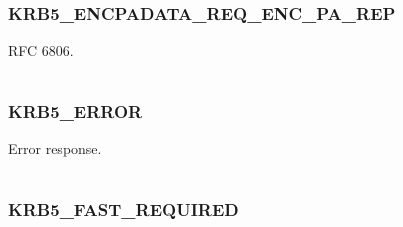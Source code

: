 \documentclass[letterpaper,10pt,english]{sphinxmanual}
\begin{document}
\subsubsection{KRB5\_ENCPADATA\_REQ\_ENC\_PA\_REP}
\label{appdev/refs/macros/KRB5_ENCPADATA_REQ_ENC_PA_REP:krb5-encpadata-req-enc-pa-rep}\label{appdev/refs/macros/KRB5_ENCPADATA_REQ_ENC_PA_REP:krb5-encpadata-req-enc-pa-rep-data}\label{appdev/refs/macros/KRB5_ENCPADATA_REQ_ENC_PA_REP::doc}

\begin{fulllineitems}
\label{appdev/refs/macros/KRB5_ENCPADATA_REQ_ENC_PA_REP:KRB5_ENCPADATA_REQ_ENC_PA_REP}
\end{fulllineitems}


RFC 6806.

\begin{tabulary}{\linewidth}{|L|L|}
\hline

 & 
\\
\hline\end{tabulary}



\subsubsection{KRB5\_ERROR}
\label{appdev/refs/macros/KRB5_ERROR:krb5-error-data}\label{appdev/refs/macros/KRB5_ERROR:krb5-error}\label{appdev/refs/macros/KRB5_ERROR::doc}

\begin{fulllineitems}
\label{appdev/refs/macros/KRB5_ERROR:KRB5_ERROR}
\end{fulllineitems}


Error response.

\begin{tabulary}{\linewidth}{|L|L|}
\hline

 & 
\\
\hline\end{tabulary}



\subsubsection{KRB5\_FAST\_REQUIRED}
\label{appdev/refs/macros/KRB5_FAST_REQUIRED:krb5-fast-required}\label{appdev/refs/macros/KRB5_FAST_REQUIRED:krb5-fast-required-data}\label{appdev/refs/macros/KRB5_FAST_REQUIRED::doc}
\end{document}
